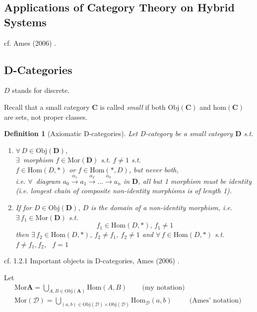 \documentclass[10pt]{amsart}
\newtheorem{definition}{Definition}
\begin{document}
\begin{multicols*}{2}
\section{Applications of Category Theory on Hybrid Systems}

cf. Ames (2006) \cite{Ames2006}.
	
\subsection{D-Categories}

$D$ stands for discrete.

Recall that a small category $\mathbf{C}$ is called \emph{small} if both $\text{Obj}(\mathbf{C})$ and $\text{hom}(\mathbf{C})$ are sets, not proper classes. 

\begin{definition}[Axiomatic D-categories]
Let D-category be a \emph{small} category $\mathbf{D}$ s.t.
\begin{enumerate}
	\item $\forall \, D \in \text{Obj}(\mathbf{D})$, \\
	$\exists \,$ morphism $f \in \text{Mor}(\mathbf{D})$ s.t. $f \neq 1$ s.t. \\
	$f \in \text{Hom}(D, *)$ or $f\in \text{Hom}(*, D)$, but never both, \\
	i.e. $\forall \, $ diagram $a_0 \xrightarrow{ \alpha_1} a_1 \xrightarrow{ \alpha_2} \dots \xrightarrow{ \alpha_n} a_n$ in $\mathbf{D}$, all but 1 morphism must be identity (i.e. longest chain of composite non-identity morphisms is of length 1). 
	\item If for $D\in \text{Obj}(\mathbf{D})$, $D$ is the domain of a non-identity morphism, i.e. $\exists \, f_1 \in \text{Mor}(\mathbf{D})$ s.t. 
	\[
	f_1 \in \text{Hom}(D, *), \, f_1 \neq 1
	\]
	then $\exists \, f_2 \in \text{Hom}(D, *)$, $f_2 \neq f_1$, $f_2 \neq 1$ and $\forall \, f \in \text{Hom}(D, *)$ s.t. $f\neq f_1,f_2$, \, $f=1$
\end{enumerate}
\end{definition}
	
cf. 1.2.1 Important objects in D-categories, Ames (2006) \cite{Ames2006}.

Let 
\[
\begin{gathered}
	\text{Mor}{\mathbf{A}} = \bigcup_{A, B \in \text{Obj}(\mathbf{A})} \text{Hom}(A,B) \qquad \, \text{(my notation)} \\
	\text{Mor}(\mathcal{D}) = \bigcup_{(a,b) \in \text{Obj}(\mathcal{D}) \times \text{Obj}(\mathcal{D}) } \text{Hom}_{\mathcal{D}}(a,b) \qquad \, \text{ (Ames' notation) }
\end{gathered}
\]	
	

\end{multicols*}
\end{document}
